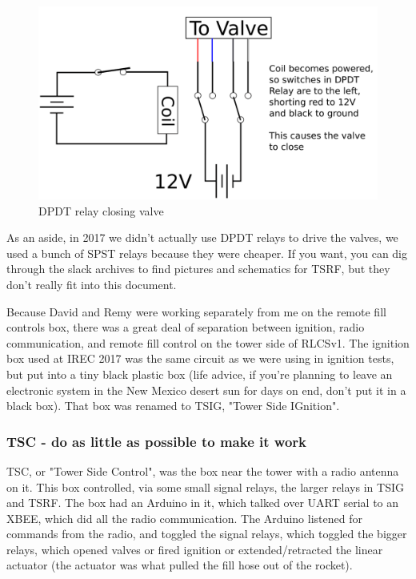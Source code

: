 \documentclass[11pt]{article}
\begin{document}
\begin{figure}[htbp]
\centering
\includegraphics[width=.9\linewidth]{./images/dpdt_closing.png}
\caption{\label{fig:orgfd0a9ba}
DPDT relay closing valve}
\end{figure}

As an aside, in 2017 we didn't actually use DPDT relays to drive the valves, we
used a bunch of SPST relays because they were cheaper. If you want, you can dig
through the slack archives to find pictures and schematics for TSRF, but they
don't really fit into this document.

Because David and Remy were working separately from me on the remote fill
controls box, there was a great deal of separation between ignition, radio
communication, and remote fill control on the tower side of RLCSv1. The ignition
box used at IREC 2017 was the same circuit as we were using in ignition tests,
but put into a tiny black plastic box (life advice, if you're planning to leave
an electronic system in the New Mexico desert sun for days on end, don't put it
in a black box). That box was renamed to TSIG, "Tower Side IGnition".

\subsubsection{TSC - do as little as possible to make it work}
\label{sec:orgc3ad791}

TSC, or "Tower Side Control", was the box near the tower with a radio antenna on
it. This box controlled, via some small signal relays, the larger relays in TSIG
and TSRF. The box had an Arduino in it, which talked over UART serial to an
XBEE, which did all the radio communication. The Arduino listened for commands
from the radio, and toggled the signal relays, which toggled the bigger relays,
which opened valves or fired ignition or extended/retracted the linear actuator
(the actuator was what pulled the fill hose out of the rocket).
\end{document}
